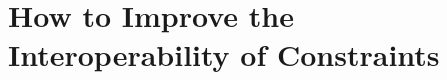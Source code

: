 \documentclass{llncs}
\newenvironment{DL}{
  \vspace{0cm}
	\begin{center}
  \begin{tabular}{r l}

}{
  \end{tabular}
	\end{center}
}
\begin{document}
{%

%
%
%

\section{How to Improve the Interoperability of Constraints}
\label{sec:transformations}

}
\end{document}
